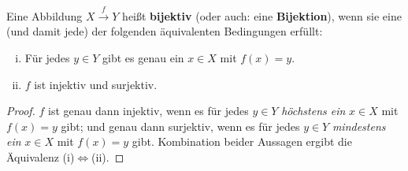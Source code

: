 \begin{defin} \label{def:bijektiv} 
    Eine Abbildung $X \xrightarrow{f} Y$ heißt \textbf{bijektiv} (oder auch: eine \textbf{Bijektion}), wenn sie eine (und damit jede) der folgenden äquivalenten Bedingungen erfüllt:
    \begin{enumerate}[(i)]
        \item Für jedes $y\in Y$ gibt es genau ein $x\in X$ mit $f(x)=y$.
        \item $f$ ist injektiv und surjektiv.
    \end{enumerate}
\end{defin}
\begin{proof}
    $f$ ist genau dann injektiv, wenn es für jedes $y\in Y$ \emph{höchstens ein} $x\in X$ mit $f(x)=y$ gibt; und genau dann surjektiv, wenn es für jedes $y\in Y$ \emph{mindestens ein} $x\in X$ mit $f(x)=y$ gibt. Kombination beider Aussagen ergibt die Äquivalenz (i)$\Leftrightarrow$(ii).
\end{proof}


